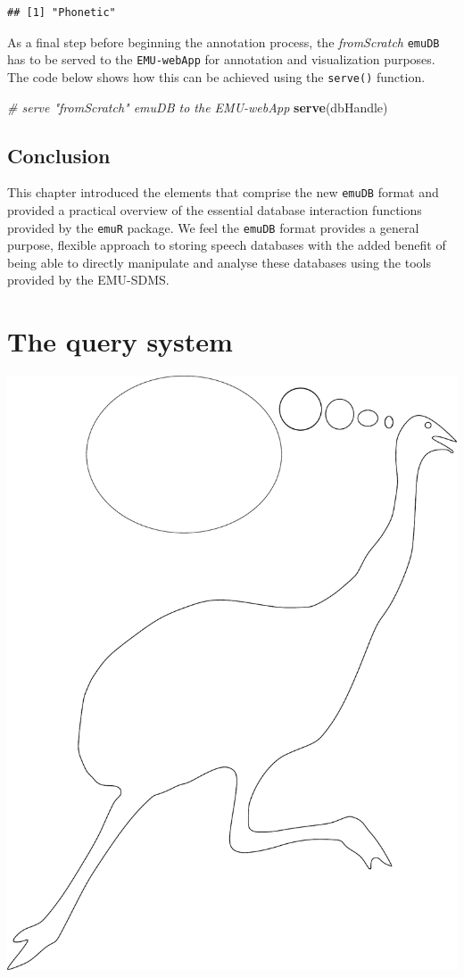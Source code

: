 \documentclass[]{book}
\newenvironment{Shaded}{\begin{snugshade}}{\end{snugshade}}
\newcommand{\CommentTok}[1]{\textcolor[rgb]{0.56,0.35,0.01}{\textit{#1}}}
\newcommand{\KeywordTok}[1]{\textcolor[rgb]{0.13,0.29,0.53}{\textbf{#1}}}
\newcommand{\NormalTok}[1]{#1}
\begin{document}
\begin{verbatim}
## [1] "Phonetic"
\end{verbatim}

As a final step before beginning the annotation process, the \emph{fromScratch} \texttt{emuDB} has to be served to the \texttt{EMU-webApp} for annotation and visualization purposes. The code below shows how this can be achieved using the \texttt{serve()} function.

\begin{Shaded}
\begin{Highlighting}[]
\CommentTok{# serve "fromScratch" emuDB to the EMU-webApp}
\KeywordTok{serve}\NormalTok{(dbHandle)}
\end{Highlighting}
\end{Shaded}

\hypertarget{conclusion-2}{%
\section{Conclusion}\label{conclusion-2}}

This chapter introduced the elements that comprise the new \texttt{emuDB} format and provided a practical overview of the essential database interaction functions provided by the \texttt{emuR} package. We feel the \texttt{emuDB} format provides a general purpose, flexible approach to storing speech databases with the added benefit of being able to directly manipulate and analyse these databases using the tools provided by the EMU-SDMS.

\hypertarget{chap:querysys}{%
\chapter{The query system}\label{chap:querysys}}

\begin{center}\includegraphics[width=0.5\linewidth]{pics/EMU-webAppEmu_query} \end{center}
\end{document}
